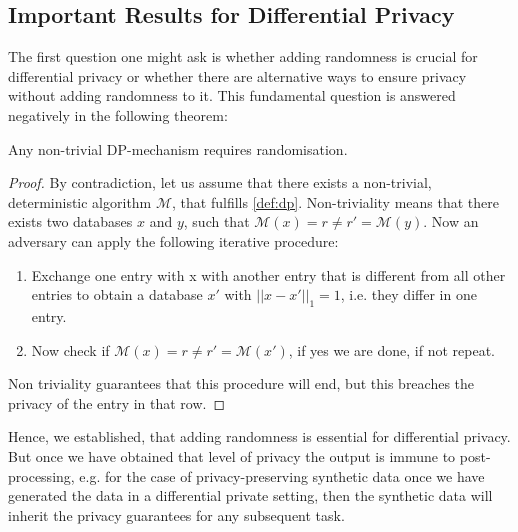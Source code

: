 \subsection{Important Results for Differential Privacy}
The first question one might ask is whether adding randomness is crucial for differential privacy or whether there are alternative ways to ensure privacy without adding randomness to it. This fundamental question is answered negatively in the following theorem:
\begin{thm} \label{thm:dp_random}
    Any non-trivial DP-mechanism requires randomisation.
\end{thm}
\begin{proof}
    By contradiction, let us assume that there exists a non-trivial, deterministic algorithm $\mathcal{M}$, that fulfills \cref{def:dp}. Non-triviality means that there exists two databases $x$ and $y$, such that $\mathcal{M}(x) = r \neq r' = \mathcal{M}(y)$. Now an adversary can apply the following iterative procedure:
    \begin{enumerate}
        \item Exchange one entry with x with another entry that is different from all other entries to obtain a database $x'$ with $||x-x'||_1 = 1$, i.e. they differ in one entry.
        \item Now check if $\mathcal{M}(x) = r\neq r'= \mathcal{M}(x')$, if yes we are done, if not repeat.
    \end{enumerate}
    Non triviality guarantees that this procedure will end, but this breaches the privacy of the entry in that row.
\end{proof}

Hence, we established, that adding randomness is essential for differential privacy. But once we have obtained that level of privacy the output is immune to post-processing, e.g. for the case of privacy-preserving synthetic data once we have generated the data in a differential private setting, then the synthetic data will inherit the privacy guarantees for any subsequent task.

